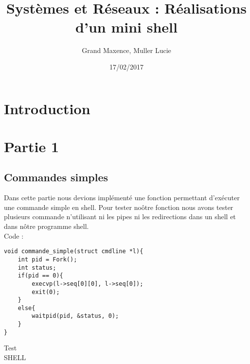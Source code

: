 \documentclass{report}
\author{Grand Maxence, Muller Lucie}
\title{Syst\`emes et R\'eseaux  : R\'ealisations d'un mini shell}
\date{17/02/2017}
\begin{document}
	
	\maketitle
	\tableofcontents

	\chapter*{Introduction}
	\chapter{Partie 1}
		\section{Commandes simples}
		Dans cette partie nous devions impl\'ement\'e une fonction permettant d'ex\'ecuter une commande simple en shell. Pour tester no\^otre fonction nous avons tester plusieurs commande n'utilisant ni les pipes ni les redirections dans un shell et dans n\^otre programme shell. \\
		Code :
		\begin{lstlisting}
void commande_simple(struct cmdline *l){
	int pid = Fork();
	int status;
	if(pid == 0){
		execvp(l->seq[0][0], l->seq[0]);
		exit(0);
	}
	else{
		waitpid(pid, &status, 0);
	}
}
		\end{lstlisting} 
		Test \\ SHELL
\end{document}
